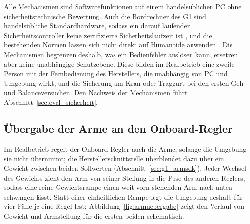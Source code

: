 Alle Mechanismen sind Softwarefunktionen auf einem handelsüblichen PC ohne sicherheitstechnische Bewertung.
Auch die Bordrechner des G1 sind handelsübliche Standardhardware, sodass ein darauf laufender Sicherheitscontroller keine zertifizierte Sicherheitslaufzeit ist \cite{Ding2026}, und die bestehenden Normen lassen sich nicht direkt auf Humanoide anwenden \cite{Prather2025}.
Die Mechanismen begrenzen deshalb, was ein Bedienfehler auslösen kann, ersetzen aber keine unabhängige Schutzebene.
Diese bilden im Realbetrieb eine zweite Person mit der Fernbedienung des Herstellers, die unabhängig von PC und Umgebung wirkt, und die Sicherung am Kran oder Traggurt bei den ersten Geh- und Balanceversuchen.
Den Nachweis der Mechanismen führt Abschnitt~\ref{sec:eval_sicherheit}.

\subsection{Übergabe der Arme an den Onboard-Regler}
\label{sec:armuebergabe}

Im Realbetrieb regelt der Onboard-Regler auch die Arme, solange die Umgebung sie nicht übernimmt; die Herstellerschnittstelle überblendet dazu über ein Gewicht zwischen beiden Sollwerten (Abschnitt~\ref{sec:g1_armsdk}).
Jeder Wechsel des Gewichts zieht den Arm von seiner Stellung in die Pose des anderen Reglers, sodass eine reine Gewichtsrampe einen weit vorn stehenden Arm nach unten schwingen lässt.
Statt einer einheitlichen Rampe legt die Umgebung deshalb für vier Fälle je eine Regel fest; Abbildung~\ref{fig:armuebergabe} zeigt den Verlauf von Gewicht und Armstellung für die ersten beiden schematisch.

